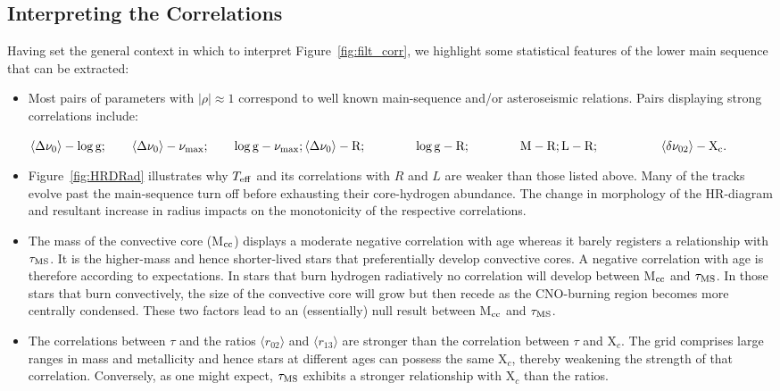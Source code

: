 \subsection{Interpreting the Correlations}
Having set the general context in which to interpret Figure~\ref{fig:filt_corr}, we highlight some statistical features of the lower main sequence that can be extracted: 

\begin{itemize}
\item Most pairs of parameters with $| \rho | \approx 1$ correspond to well known main-sequence and/or asteroseismic relations. Pairs displaying strong correlations include:

\begin{math}
\langle\Delta\nu_0\rangle  -  \log \rm{g}; \qquad   \langle\Delta\nu_0\rangle - \nu_{\rm{max}}; \qquad     \log \rm{g}  - \nu_{\rm{max}};  \\
\langle\Delta\nu_0\rangle  -  R;   \qquad   \qquad     \log \rm{g} - R;            \qquad              \qquad   M  -  R;  \\
 L - R; \qquad \quad  \qquad\langle\delta\nu_{02}\rangle - X_c.
\end{math}

\item Figure~\ref{fig:HRDRad} illustrates why $T_{\rm{eff}}$ and its correlations with $R$ and $L$ are weaker than those listed above. 
Many of the tracks evolve past the main-sequence turn off before exhausting their core-hydrogen abundance. The change in morphology of the HR-diagram and resultant increase in radius impacts on the monotonicity of the respective correlations. 

 

\item The mass of the convective core (M$_{\rm{cc}}$) displays a moderate negative correlation with age whereas it barely registers a relationship with $\tau_{\rm{MS}}$. 
It is the higher-mass and hence shorter-lived stars that preferentially develop convective cores. A negative correlation with age is therefore according to expectations.  
In stars that burn hydrogen radiatively no correlation will develop between M$_{\rm{cc}}$ and $\tau_{\rm{MS}}$. 
In those stars that burn convectively, the size of the convective core will grow but then recede as the CNO-burning region becomes more centrally condensed. 
These two factors lead to an (essentially) null result between M$_{\rm{cc}}$ and $\tau_{\rm{MS}}$. 


\item The correlations between $\tau$ and the ratios $\langle r_{02}\rangle$ and $\langle r_{13}\rangle$ are stronger than the correlation between $\tau$ and  X$_c$. 
The grid comprises large ranges in mass and metallicity and hence stars at different ages can possess the same X$_c$, thereby weakening the strength of that correlation.
Conversely, as one might expect,  $\tau_{\rm{MS}}$ exhibits a stronger relationship with X$_c$ than the ratios. 


\end{itemize}
